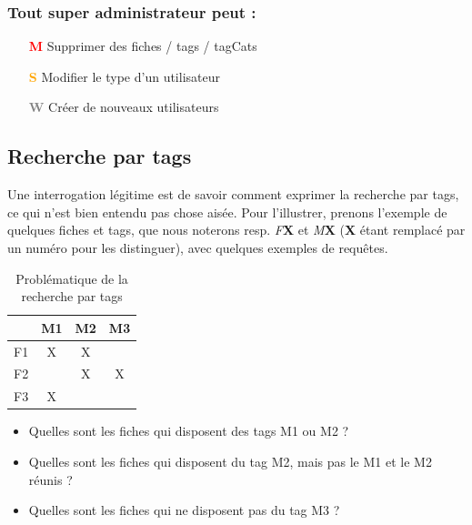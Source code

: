 \subsubsection*{Tout super administrateur peut : }
\begin{itemize}
    \item[\textcolor{red}{\textbf{M}}] Supprimer des \glspl{fiche} / \glspl{tag} / \glspl{tagCat}
    \item[\textcolor{orange}{\textbf{S}}] Modifier le type d'un utilisateur
    \item[\textcolor{gray}{\textbf{W}}] Créer de nouveaux utilisateurs
\end{itemize}
\pagebreak

\subsection*{Recherche par \glspl{tag}}

Une interrogation légitime est de savoir comment exprimer la recherche par \glspl{tag}, ce qui n'est bien entendu pas chose aisée.
Pour l'illustrer, prenons l'exemple de quelques \glspl{fiche} et \glspl{tag}, que nous noterons resp. \textit{F}\textbf{X} et \textit{M}\textbf{X}
(\textbf{X} étant remplacé par un numéro pour les distinguer), avec quelques exemples de requêtes.

\begin{table}[H]
    \centering
    \begin{tabular}{|c|c|c|c|}
        \hline
            & M1 & M2 & M3 \\ \hline
            F1 & X  & X  &    \\ \hline
            F2 &    & X  & X  \\ \hline
            F3 & X  &    &    \\ \hline
    \end{tabular}
    \caption{Problématique de la recherche par \glspl{tag}}
    \label{tab:fichesWithTagExample}
\end{table}

\begin{itemize}
    \item Quelles sont les \glspl{fiche} qui disposent des \glspl{tag} M1 ou M2 ?
    \item Quelles sont les \glspl{fiche} qui disposent du \gls{tag} M2, mais pas le M1 et le M2 réunis ?
    \item Quelles sont les \glspl{fiche} qui ne disposent pas du \gls{tag} M3 ?
\end{itemize}


